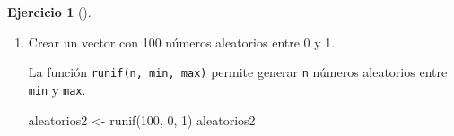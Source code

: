 \documentclass[
  a4paper,
]{scrreport}
\newenvironment{Shaded}{\begin{snugshade}}{\end{snugshade}}
\newcommand{\DecValTok}[1]{\textcolor[rgb]{0.68,0.00,0.00}{#1}}
\newcommand{\FunctionTok}[1]{\textcolor[rgb]{0.28,0.35,0.67}{#1}}
\newcommand{\NormalTok}[1]{\textcolor[rgb]{0.00,0.23,0.31}{#1}}
\newcommand{\OtherTok}[1]{\textcolor[rgb]{0.00,0.23,0.31}{#1}}
\newcommand{\SpecialCharTok}[1]{\textcolor[rgb]{0.37,0.37,0.37}{#1}}
\theoremstyle{definition}
\newtheorem{exercise}{Ejercicio}[chapter]
\theoremstyle{remark}
\begin{document}
\begin{exercise}[]
\begin{enumerate}
\begin{tcolorbox}
  El operador \texttt{\%\%} permite calcular el resto de la división
  entera de dos números. Si el resto es 0, el número es par. Y el
  operador \texttt{==} permite comparar dos vectores elemento a
  elemento.

\begin{Shaded}
\begin{Highlighting}[]
\NormalTok{par }\OtherTok{\textless{}{-}}\NormalTok{ aleatorios }\SpecialCharTok{\%\%} \DecValTok{2} \SpecialCharTok{==} \DecValTok{0}
\NormalTok{par}
\end{Highlighting}
\end{Shaded}

\begin{verbatim}
[1]  TRUE  TRUE  TRUE  TRUE FALSE
\end{verbatim}

  \end{tcolorbox}
\item
  Crear un vector con 100 números aleatorios entre 0 y 1.

  \begin{tcolorbox}[enhanced jigsaw, colframe=quarto-callout-tip-color-frame, toprule=.15mm, bottomtitle=1mm, breakable, opacitybacktitle=0.6, toptitle=1mm, colback=white, bottomrule=.15mm, title=\textcolor{quarto-callout-tip-color}{\faLightbulb}\hspace{0.5em}{Solución}, arc=.35mm, left=2mm, titlerule=0mm, rightrule=.15mm, coltitle=black, leftrule=.75mm, opacityback=0, colbacktitle=quarto-callout-tip-color!10!white]

  La función \texttt{runif(n,\ min,\ max)} permite generar \texttt{n}
  números aleatorios entre \texttt{min} y \texttt{max}.

\begin{Shaded}
\begin{Highlighting}[]
\NormalTok{aleatorios2 }\OtherTok{\textless{}{-}} \FunctionTok{runif}\NormalTok{(}\DecValTok{100}\NormalTok{, }\DecValTok{0}\NormalTok{, }\DecValTok{1}\NormalTok{)}
\NormalTok{aleatorios2}
\end{Highlighting}
\end{Shaded}


\end{tcolorbox}
\end{enumerate}
\end{exercise}
\end{document}
